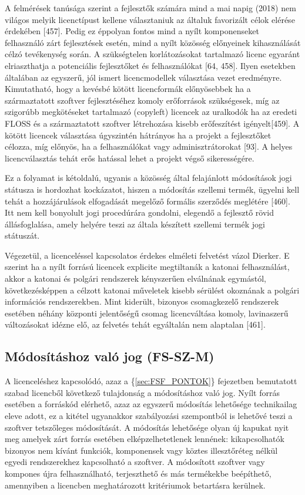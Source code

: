 \documentclass[12pt,magyar,a4paper,oneside]{scrreprt}
\begin{document}
A felmérések tanúsága szerint a fejlesztők számára mind a mai napig
(2018) nem világos melyik licenctípust kellene választaniuk az általuk
favorizált célok elérése érdekében {[}457{]}. Pedig ez éppolyan fontos
mind a nyílt komponenseket felhasználó zárt fejlesztések esetén, mind a
nyílt közösség előnyeinek kihasználását célzó tevékenység során. A
szükségtelen korlátozásokat tartalmazó licenc egyaránt elriaszthatja a
potenciális fejlesztőket és felhasználókat {[}64, 458{]}. Ilyen
esetekben általában az egyszerű, jól ismert licencmodellek választása
vezet eredményre. Kimutatható, hogy a kevésbé kötött licencformák
előnyösebbek ha a származtatott szoftver fejlesztéséhez komoly
erőforrások szükségesek, míg az szigorúbb megkötéseket tartalmazó
(copyleft) licencek az uralkodók ha az eredeti FLOSS és a származtatott
szoftver létrehozása kisebb erőfeszítést igényelt{[}459{]}. A kötött
licencek választása úgyszintén hátrányos ha a projekt a fejlesztőket
célozza, míg előnyös, ha a felhasználókat vagy adminisztrátorokat
{[}93{]}. A helyes licencválasztás tehát erős hatással lehet a projekt
végső sikerességére.

Ez a folyamat is kétoldalú, ugyanis a közösség által felajánlott
módosítások jogi státusza is hordozhat kockázatot, hiszen a módosítás
szellemi termék, ügyelni kell tehát a hozzájárulások elfogadását
megelőző formális szerződés meglétére {[}460{]}. Itt nem kell bonyolult
jogi procedúrára gondolni, elegendő a fejlesztő rövid állásfoglalása,
amely helyére teszi az általa készített szellemi termék jogi státuszát.

Végezetül, a licenceléssel kapcsolatos érdekes elméleti felvetést vázol
Dierker. E szerint ha a nyílt forrású licencek explicite megtiltanák a
katonai felhasználást, akkor a katonai és polgári rendszerek kényszerűen
elválnának egymástól, következésképpen a célzott katonai műveletek
kisebb sérülést okoznának a polgári információs rendszerekben. Mint
kiderült, bizonyos csomagkezelő rendszerek esetében néhány központi
jelentőségű csomag licencváltása komoly, lavinaszerű változásokat idézne
elő, az felvetés tehát egyáltalán nem alaptalan {[}461{]}.

\hypertarget{sec:FS-SZ-M}{%
\subsection{Módosításhoz való jog (FS-SZ-M)}\label{sec:FS-SZ-M}}

A licenceléshez kapcsolódó, azaz a \{\ref{sec:FSF_PONTOK}\} fejezetben
bemutatott szabad licencből következő tulajdonság a módosításhoz való
jog. Nyílt forrás esetében a forráskód elérhető, azaz az egyszerű
módosítás lehetősége technikailag eleve adott, ez a kitétel ugyanakkor
szabályozási szempontból is lehetővé teszi a szoftver tetszőleges
módosítását. A módosítás lehetősége olyan új kapukat nyit meg amelyek
zárt forrás esetében elképzelhetetlenek lennének: kikapcsolhatók
bizonyos nem kívánt funkciók, komponensek vagy köztes illesztőréteg
nélkül egyedi rendszerekhez kapcsolható a szoftver. A módosított
szoftver vagy kompones újra felhasználható, terjeszthető és más
termékekbe beépíthető, amennyiben a licencben meghatározott kritériumok
betartásra kerülnek.
\end{document}
